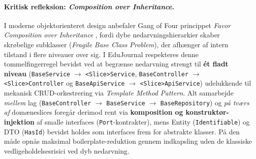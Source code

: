 \documentclass[11pt,a4paper]{article}
\begin{document}
\begin{table}[htbp]
\paragraph{Kritisk refleksion: \textit{Composition over Inheritance}.}
I moderne objektorienteret design anbefaler Gang of Four princippet \textit{Favor Composition over Inheritance} \cite{gamma1994}, fordi dybe nedarvningshierarkier skaber skrøbelige subklasser (\textit{Fragile Base Class Problem}), der afhænger af intern tilstand i flere niveauer over sig. I EduJournal respekteres denne tommelfingerregel bevidst ved at begrænse nedarvning strengt til \textbf{ét fladt niveau} (\texttt{BaseService} $\rightarrow$ \texttt{<Slice>Service}, \texttt{BaseController} $\rightarrow$ \texttt{<Slice>Controller} og \texttt{BaseApiService} $\rightarrow$ \texttt{<Slice>ApiService}) udelukkende til mekanisk CRUD-orkestrering via \textit{Template Method Pattern}. Alt samarbejde \textit{mellem} lag (\texttt{BaseController} $\rightarrow$ \texttt{BaseService} $\rightarrow$ \texttt{BaseRepository}) og \textit{på tværs af} domæneslices foregår derimod rent via \textbf{komposition og konstruktør-injektion} af smalle interfaces (\texttt{Port}-kontrakter), mens Entity (\texttt{Identifiable}) og DTO (\texttt{HasId}) bevidst holdes som interfaces frem for abstrakte klasser. På den måde opnås maksimal boilerplate-reduktion gennem indkapsling uden de klassiske vedligeholdelsesrisici ved dyb nedarvning.


\end{table}
\end{document}
